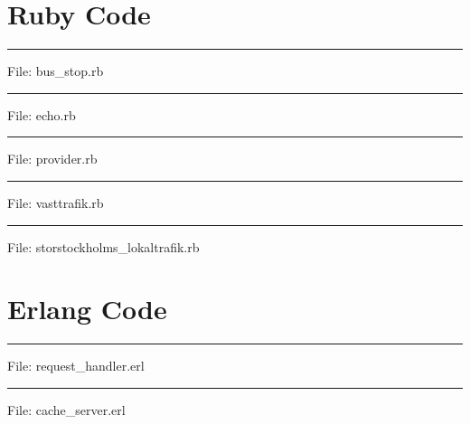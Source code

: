 \appendix

\chapter{Ruby Code}
\label{cha:ruby}

\noindent
\rule{2cm}{0.5pt} File: bus\_stop.rb \hrulefill


\noindent
\rule{2cm}{0.5pt} File: echo.rb \hrulefill


\noindent
\rule{2cm}{0.5pt} File: provider.rb \hrulefill


\noindent
\rule{2cm}{0.5pt} File: vasttrafik.rb \hrulefill


\noindent
\rule{2cm}{0.5pt} File: storstockholms\_lokaltrafik.rb \hrulefill


\chapter{Erlang Code}
\label{cha:erlang}

\noindent
\rule{2cm}{0.5pt} File: request\_handler.erl \hrulefill


\noindent
\rule{2cm}{0.5pt} File: cache\_server.erl \hrulefill

